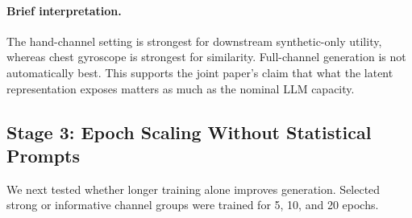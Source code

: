 \paragraph{Brief interpretation.}
The hand-channel setting is strongest for downstream synthetic-only utility,
whereas chest gyroscope is strongest for similarity. Full-channel generation is
not automatically best. This supports the joint paper's claim that what the
latent representation exposes matters as much as the nominal LLM capacity.

\subsection*{Stage 3: Epoch Scaling Without Statistical Prompts}

We next tested whether longer training alone improves generation. Selected
strong or informative channel groups were trained for 5, 10, and 20 epochs.

\begin{table}[t]
\centering
\small
\caption{Epoch scaling without statistical prompts. Longer training changes the
trade-off but does not monotonically improve utility or similarity.}
\label{tab:shanjun-epoch}
\end{table}

